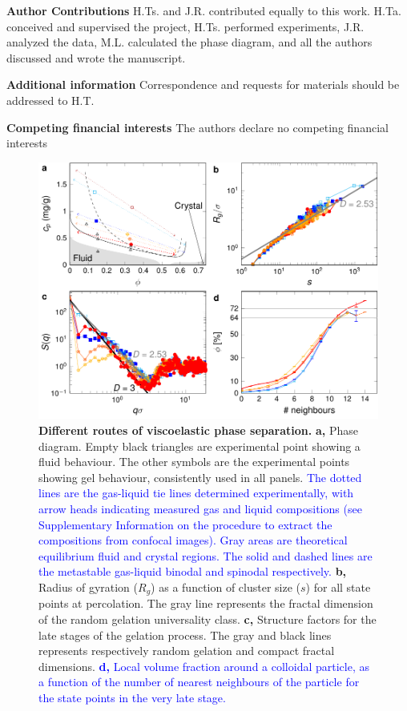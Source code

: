 \documentclass[preprint,amsmath,amssymb,superscriptaddress]{revtex4-1}
\begin{document}
\vspace{0.3cm}
\noindent
{\bf Author Contributions} 
H.Ts. and J.R. contributed equally to this work. 
H.Ta. conceived and supervised the project, H.Ts. performed experiments, J.R. analyzed the data, M.L. calculated the phase diagram, and all the authors discussed and wrote the manuscript. 

\vspace{0.3cm}
\noindent
{\bf Additional information} 
Correspondence and requests for materials should be addressed to H.T. 

\vspace{0.3cm}
\noindent
{\bf Competing financial interests}
The authors declare no competing financial interests


\clearpage

\begin{figure}[!t]
 \centering
 \includegraphics{phase_separation.pdf}
 \caption{{\bf Different routes of viscoelastic phase separation.} 
{\bf a,} Phase diagram. Empty black triangles are experimental point showing a fluid behaviour. The other symbols are the experimental points showing gel behaviour, consistently used in all panels. \textcolor{blue}{The dotted lines are the gas-liquid tie lines determined experimentally, with arrow heads indicating measured gas and liquid compositions (see Supplementary Information on the procedure to extract the compositions from confocal images).  Gray areas are theoretical equilibrium fluid and crystal regions. The solid and dashed lines are the metastable gas-liquid binodal and spinodal respectively.}
{\bf b,} Radius of gyration ($R_g$) as a function of cluster size ($s$) for all state points at percolation. The
 gray line represents the fractal dimension of the random gelation universality class.
{\bf c,} Structure factors for the late stages of the gelation process. The gray and black lines represents respectively random gelation and compact fractal dimensions.
\textcolor{blue}{{\bf d,} Local volume fraction around a colloidal particle, as a function of the number of nearest neighbours of the particle for the state points in the very late stage.}
 }
 \label{fig:phase_separation}
\end{figure}
\end{document}
